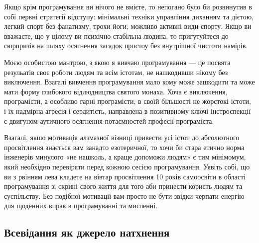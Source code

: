 Якщо крім програмування ви нічого не вмієте, то непогано було би розвинутив в собі первні
стратегії відступу: мінімальні техніки управління диханням та дієтою, легкий спорт без
фанатизму, трохи йоги, можливо активні види спорту. Якщо ви вважаєте, що у цілому
ви психічно стабільна людина, то пригутуйтеся до сюрпризів на шляху осягнення загадок
простоу без внутрішної чистоти намірів.

Моєю особистою мантрою, з якою я вивчаю програмування --- це посвята резульатів своє
роботи людям та всім істотам, не нашкодивши нікому без виключення.
Взагалі вивчення програмування мало кому може зашкодити та може мати форму глибокого відлюдництва
святого монаха. Хоча є виключення, програмісти, а особливо гарні програмісти,
в своїй більшості не жорстокі істоти, і їх надмірна агресія і сердитість, направлена
в позитивному ключі інстроспекції є двигуном аутичного осягнення потаємностей професії програміста.

Взагалі, якшо мотивація алзмазної візниці привести усі істот до абсолютного просвітлення
знається вам занадто езотеричної, то хочи би стара етично норма інженерів минулого 
«не нашколь, а краще допоможи людям» є тим мінімомум, який необхідно перевіряти перед кожною сесією
програмування. Уявіть собі, що ви з рвінням лева кладете на вівтар просвітлення 10 років
самоосвіти в області програмування зі скрині свого життя для того аби принести користь людям та суспільству.
Без подібної мотивації вам просто не бути звідки черпати енергію для щоденних вправ в програмуванні та мисленні.

\subsection{Всевідання як джерело натхнення}

